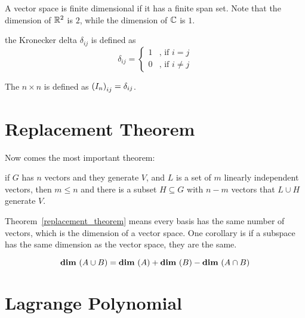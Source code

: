 A vector space is finite dimensional if it has a finite span set. Note that the dimension of $\mathbb{R}^2$ is $2$, while the dimension of $\mathbb{C}$ is $1$.


\begin{definition}\label{kronecker_delta}
	the Kronecker delta $\delta_{ij}$ is defined as 
	\begin{equation}
		\delta_{ij} = \begin{cases}
			1 & \text{, if } i = j \\
			0 & \text{, if } i \neq j
 		\end{cases}
	\end{equation}
\end{definition}

\begin{definition}
	The $n\times n$   is defined as $\mleft(I_n \mright)_{ij} = \delta_{ij}$.
\end{definition}



\section{Replacement Theorem}
Now comes the most important theorem:
\begin{theorem}\label{replacement_theorem}
    if $G$ has $n$ vectors and they generate $V$, and $L$ is a set of $m$ linearly independent vectors, then $m \leq n$ and there is a subset $H \subseteq G$ with $n-m$ vectors that $L \cup H $ generate $V$.
    
\end{theorem}

Theorem~\ref{replacement_theorem} means every basis has the same number of vectors, which is the dimension of a vector space. One corollary is if a subspace has the same dimension as the vector space, they are the same.


\begin{theorem}
    \begin{equation}
        \dimension{A\cup B} = \dimension{A} + \dimension{B} - \dimension{A \cap B}
    \end{equation}    
\end{theorem}


\section{Lagrange Polynomial}

